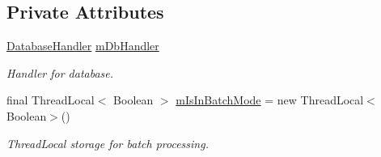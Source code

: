 \subsection*{Private Attributes}
\begin{DoxyCompactItemize}
\item 
\hyperlink{classuk_1_1ac_1_1swan_1_1digitaltrails_1_1database_1_1_database_handler}{Database\+Handler} \hyperlink{classuk_1_1ac_1_1swan_1_1digitaltrails_1_1database_1_1_white_rock_content_provider_a1bb18cdc9de00fe8911b455ded3b1dd8}{m\+Db\+Handler}
\begin{DoxyCompactList}\small\item\em Handler for database. \end{DoxyCompactList}\item 
final Thread\+Local$<$ Boolean $>$ \hyperlink{classuk_1_1ac_1_1swan_1_1digitaltrails_1_1database_1_1_white_rock_content_provider_a157bdfbd418ec0dcf1e2949cacb634d2}{m\+Is\+In\+Batch\+Mode} = new Thread\+Local$<$Boolean$>$()
\begin{DoxyCompactList}\small\item\em Thread\+Local storage for batch processing. \end{DoxyCompactList}\end{DoxyCompactItemize}
